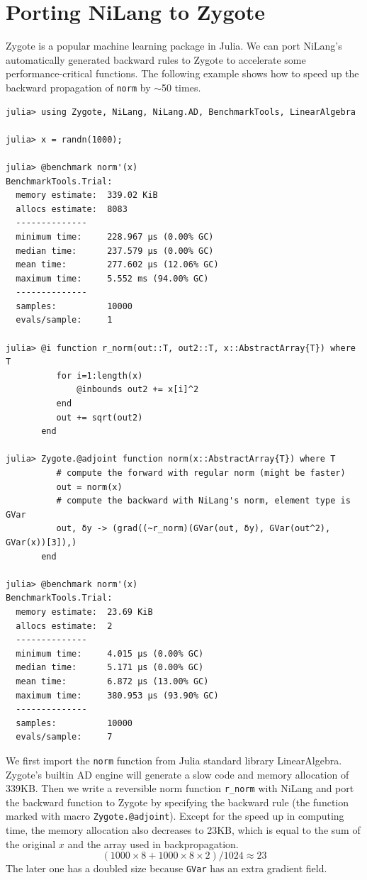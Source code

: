 \documentclass{article}
\newcommand{\<}{\langle}
\renewcommand{\>}{\rangle}
\theoremstyle{definition}\newtheorem{definition}{\textit{Definition}}
\begin{document}
\section{Porting NiLang to Zygote}\label{app:zygote}

Zygote is a popular machine learning package in Julia. We can port NiLang's automatically generated backward rules to Zygote to accelerate some performance-critical functions.
The following example shows how to speed up the backward propagation of \texttt{norm} by $\sim$50 times.

\begin{minipage}{.88\textwidth}
    \begin{lstlisting}[mathescape=true,caption={Porting NiLang to Zygote.},label={lst:zygote}, frame=tlrb]
julia> using Zygote, NiLang, NiLang.AD, BenchmarkTools, LinearAlgebra

julia> x = randn(1000);

julia> @benchmark norm'(x)
BenchmarkTools.Trial: 
  memory estimate:  339.02 KiB
  allocs estimate:  8083
  --------------
  minimum time:     228.967 μs (0.00% GC)
  median time:      237.579 μs (0.00% GC)
  mean time:        277.602 μs (12.06% GC)
  maximum time:     5.552 ms (94.00% GC)
  --------------
  samples:          10000
  evals/sample:     1

julia> @i function r_norm(out::T, out2::T, x::AbstractArray{T}) where T
          for i=1:length(x)
              @inbounds out2 += x[i]^2
          end
          out += sqrt(out2)
       end

julia> Zygote.@adjoint function norm(x::AbstractArray{T}) where T
          # compute the forward with regular norm (might be faster)
          out = norm(x)
          # compute the backward with NiLang's norm, element type is GVar
          out, δy -> (grad((~r_norm)(GVar(out, δy), GVar(out^2), GVar(x))[3]),)
       end

julia> @benchmark norm'(x)
BenchmarkTools.Trial: 
  memory estimate:  23.69 KiB
  allocs estimate:  2
  --------------
  minimum time:     4.015 μs (0.00% GC)
  median time:      5.171 μs (0.00% GC)
  mean time:        6.872 μs (13.00% GC)
  maximum time:     380.953 μs (93.90% GC)
  --------------
  samples:          10000
  evals/sample:     7
\end{lstlisting}
\end{minipage}

We first import the \texttt{norm} function from Julia standard library LinearAlgebra.
Zygote's builtin AD engine will generate a slow code and memory allocation of 339KB.
Then we write a reversible norm function \texttt{r\_norm} with NiLang and port the backward function to Zygote by specifying the backward rule (the function marked with macro \texttt{Zygote.@adjoint}).
Except for the speed up in computing time, the memory allocation also decreases to 23KB, which is equal to the sum of the original $x$ and the array used in backpropagation.
$$(1000\times 8 + 1000\times 8\times 2)/1024 \approx 23$$
The later one has a doubled size because \texttt{GVar} has an extra gradient field.
\end{document}
